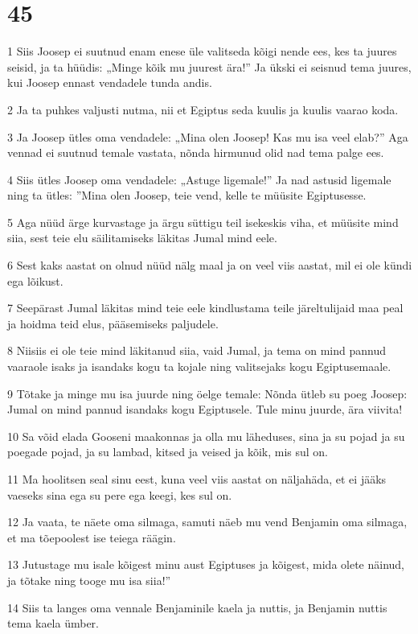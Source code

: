 \chapter{45}

\par 1 Siis Joosep ei suutnud enam enese üle valitseda kõigi nende ees, kes ta juures seisid, ja ta hüüdis: „Minge kõik mu juurest ära!” Ja ükski ei seisnud tema juures, kui Joosep ennast vendadele tunda andis.
\par 2 Ja ta puhkes valjusti nutma, nii et Egiptus seda kuulis ja kuulis vaarao koda.
\par 3 Ja Joosep ütles oma vendadele: „Mina olen Joosep! Kas mu isa veel elab?” Aga vennad ei suutnud temale vastata, nõnda hirmunud olid nad tema palge ees.
\par 4 Siis ütles Joosep oma vendadele: „Astuge ligemale!” Ja nad astusid ligemale ning ta ütles: ”Mina olen Joosep, teie vend, kelle te müüsite Egiptusesse.
\par 5 Aga nüüd ärge kurvastage ja ärgu süttigu teil isekeskis viha, et müüsite mind siia, sest teie elu säilitamiseks läkitas Jumal mind eele.
\par 6 Sest kaks aastat on olnud nüüd nälg maal ja on veel viis aastat, mil ei ole kündi ega lõikust.
\par 7 Seepärast Jumal läkitas mind teie eele kindlustama teile järeltulijaid maa peal ja hoidma teid elus, pääsemiseks paljudele.
\par 8 Niisiis ei ole teie mind läkitanud siia, vaid Jumal, ja tema on mind pannud vaaraole isaks ja isandaks kogu ta kojale ning valitsejaks kogu Egiptusemaale.
\par 9 Tõtake ja minge mu isa juurde ning öelge temale: Nõnda ütleb su poeg Joosep: Jumal on mind pannud isandaks kogu Egiptusele. Tule minu juurde, ära viivita!
\par 10 Sa võid elada Gooseni maakonnas ja olla mu läheduses, sina ja su pojad ja su poegade pojad, ja su lambad, kitsed ja veised ja kõik, mis sul on.
\par 11 Ma hoolitsen seal sinu eest, kuna veel viis aastat on näljahäda, et ei jääks vaeseks sina ega su pere ega keegi, kes sul on.
\par 12 Ja vaata, te näete oma silmaga, samuti näeb mu vend Benjamin oma silmaga, et ma tõepoolest ise teiega räägin.
\par 13 Jutustage mu isale kõigest minu aust Egiptuses ja kõigest, mida olete näinud, ja tõtake ning tooge mu isa siia!”
\par 14 Siis ta langes oma vennale Benjaminile kaela ja nuttis, ja Benjamin nuttis tema kaela ümber.
